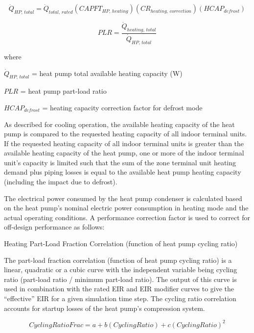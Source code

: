 \begin{equation}
  \dot{Q}_{HP,\,total} = \dot{Q}_{total,\,rated} \left( CAPFT_{HP,\,heating} \right) \left( CR_{heating,\,correction} \right) \left( HCAP_{defrost} \right)
\end{equation}

\begin{equation}
  PLR = \frac{\dot{Q}_{heating,\,total}}{\dot{Q}_{HP,\,total}}
\end{equation}

where

\(\dot{Q}_{HP,\,total}\) = heat pump total available heating capacity (W)

\(PLR\) = heat pump part-load ratio

\(HCAP_{defrost}\) = heating capacity correction factor for defrost mode

As described for cooling operation, the available heating capacity of the heat pump is compared to the requested heating capacity of all indoor terminal units. If the requested heating capacity of all indoor terminal units is greater than the available heating capacity of the heat pump, one or more of the indoor terminal unit's capacity is limited such that the sum of the zone terminal unit heating demand plus piping losses is equal to the available heat pump heating capacity (including the impact due to defrost).

The electrical power consumed by the heat pump condenser is calculated based on the heat pump's nominal electric power consumption in heating mode and the actual operating conditions. A performance correction factor is used to correct for off-design performance as follows:

Heating Part-Load Fraction Correlation (function of heat pump cycling ratio)

The part-load fraction correlation (function of heat pump cycling ratio) is a linear, quadratic or a cubic curve with the independent variable being cycling ratio (part-load ratio / minimum part-load ratio). The output of this curve is used in combination with the rated EIR and EIR modifier curves to give the ``effective'' EIR for a given simulation time step. The cycling ratio correlation accounts for startup losses of the heat pump's compression system.

\begin{equation}
  CyclingRatioFrac = a + b \left( CyclingRatio \right) + c \left( CyclingRatio \right)^2
\end{equation}

